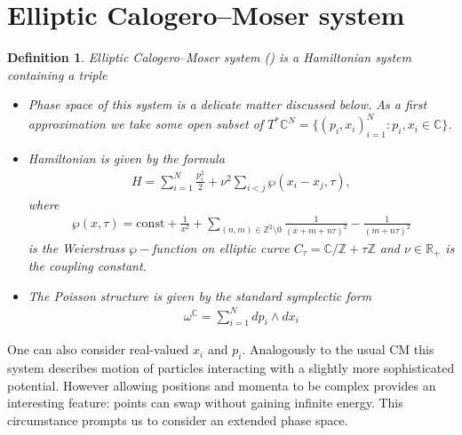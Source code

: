 \documentclass[12pt]{article}
\newtheorem{defn}{Definition}[section]
\numberwithin{equation}{section}
\theoremstyle{definition}
\begin{document}
\section{Elliptic Calogero--Moser system}
\begin{defn}\normalfont
    Elliptic Calogero--Moser system (\cite{Calogero:1975}) is a Hamiltonian system containing a triple
\begin{itemize}[label=\raisebox{0.25ex}{\tiny$\bullet$}]
\item Phase space of this system is a delicate matter discussed below. As a first approximation we take some open subset of $T^{*}\mathbb{C}^{N} = \{(p_i , x_i)_{i = 1}^{N}: p_i , x_i \in \mathbb{C}\}$. 
\item
    Hamiltonian is given by the formula
\begin{align*}
    H = \sum\limits_{i = 1}^{N} \frac{p_i^2}{2} + \nu^2 \sum\limits_{i < j} \wp (x_i - x_j , \tau),  
\end{align*}    
where
\begin{align*}
    \wp (x, \tau) =\mathrm{const} + \frac{1}{x^2} + \sum\limits_{(n, m) \in \mathbb{Z}^2 \setminus 0} \frac{1}{(x + m + n\tau)^2} - \frac{1}{(m + n \tau)^2}
\end{align*}
is the Weierstrass $\wp-$function on elliptic curve $C_{\tau} = \mathbb{C} \big/ \mathbb{Z} + \tau \mathbb{Z}$ and $\nu \in \mathbb{R}_{+}$ is the coupling constant.
\item The Poisson structure is given by the standard symplectic form
\begin{align*}
    \omega^{\mathbb{C}} = \sum\limits_{i = 1}^{N} dp_i \wedge dx_i
\end{align*}
\end{itemize}
\end{defn}
One can also consider real-valued $x_i$ and $p_i$. Analogously to the usual CM this system describes motion of particles interacting with a slightly more sophisticated potential. However allowing positions and momenta to be complex provides an interesting feature: points can swap without gaining infinite energy. This circumstance prompts us to consider an extended phase space. 
\end{document}
